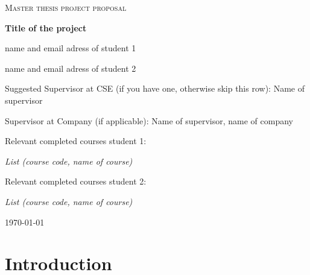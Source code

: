 \documentclass{article}
\begin{document}
\begin{titlepage}
  

\centering
  
  
{\scshape\LARGE Master thesis project proposal\\}
  
\vspace{0.5cm}
  
{\huge\bfseries Title of the project\\}
  
\vspace{2cm}
  
{\Large name and email adress of student 1\\}
  
\vspace{0.2cm}
  
{\Large name and email adress of student 2\\}
  
\vspace{1.0cm}
  
{\large Suggested Supervisor at CSE (if you have one, otherwise skip this row): Name of supervisor\\}
  
\vspace{1.5cm}
  
{\large Supervisor at Company (if applicable): Name of supervisor, name of company\\}
  
\vspace{1.5cm}
  
{\large Relevant completed courses student 1:\par}
  
{\itshape List (course code, name of course)\\}
  
\vspace{1.5cm}
  
{\large Relevant completed courses student 2:\par}
  
{\itshape List (course code, name of course)\\}
  
\vfill

  

\vfill
  
{\large \today\\} 


\end{titlepage}

\section{Introduction}
\end{document}
